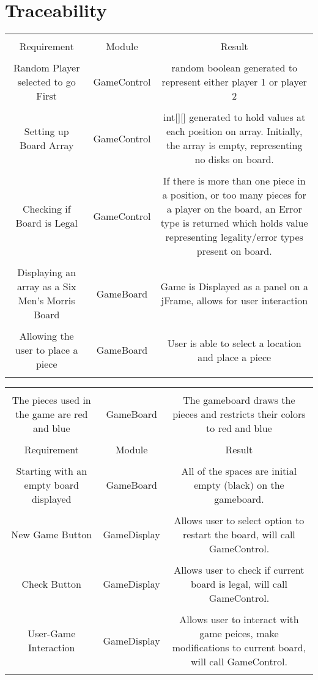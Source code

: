 \documentclass[12pt]{article}
\begin{document}
	\section{Traceability}
	\begin{tabularx}{\linewidth}{|C|C|C|}
		\hline \\
		Requirement & Module & Result \\
		\hline \\
		Random Player selected to go First & GameControl & random boolean generated to represent either player 1 or player 2 \\
		\hline \\
		Setting up Board Array & GameControl & int[][] generated to hold values at each position on array. Initially, the array is empty, representing no disks on board. \\
		\hline \\
		Checking if Board is Legal & GameControl & If there is more than one piece in a position, or too many pieces for a player on the board, an Error type is returned which holds value representing legality/error types present on board. \\
		\hline \\
		Displaying an array as a Six Men's Morris Board &
		GameBoard & Game is Displayed as a panel on a jFrame, allows for user interaction \\ 
		\hline \\
		Allowing the user to place a piece & GameBoard &
		User is able to select a location and place a piece \\
		
		\hline \\
	\end{tabularx}
		\begin{tabularx}{\linewidth}{|C|C|C|}
			\hline \\
			The pieces used in the game are red and blue & GameBoard & The gameboard draws the pieces and restricts their colors to red and blue \\
			\hline \\
			Requirement & Module & Result \\
			\hline \\
			Starting with an empty board displayed & GameBoard & All of the spaces are initial empty (black) on the gameboard. \\
			\hline \\
			New Game Button & GameDisplay & Allows user to select option to restart the board, will call GameControl. \\
			\hline \\
			Check Button & GameDisplay  & Allows user to check if current board is legal, will call GameControl. \\
			\hline \\
			User-Game Interaction & GameDisplay &Allows user to interact with game peices, make modifications to current board, will call GameControl. \\
			\hline \\
	\end{tabularx}
	
\end{document}
